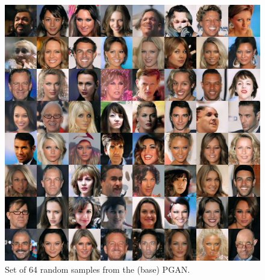 \documentclass{article}
\newcommand{\exfactor}{1.0}
\begin{document}
\begin{figure}[htbp]
    \centering
    \includegraphics[width=\exfactor\textwidth]{figures/pgan/all_base_iso_base.jpg}
    \caption{
    Set of 64 random samples from the (base) PGAN\@.
    }
\end{figure}
\end{document}
